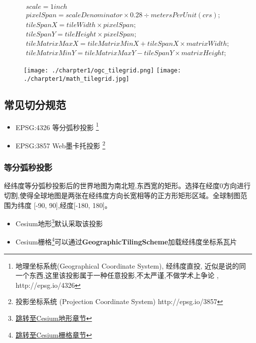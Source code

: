 \begin{align}
	scale = 1 inch                                                    \\
	pixelSpan = scaleDenominator \times 0.28 \div metersPerUnit(crs); \\
	tileSpanX = tileWidth \times pixelSpan;                           \\
	tileSpanY = tileHeight \times pixelSpan;                          \\
	tileMatrixMaxX = tileMatrixMinX + tileSpanX \times matrixWidth;   \\
	tileMatrixMinY = tileMatrixMaxY - tileSpanY \times matrixHeight;
\end{align}

\begin{figure}[!htb]
	\centering
	\texttt{[image: ./charpter1/ogc\_tilegrid.png]}
	\texttt{[image: ./charpter1/math\_tilegrid.jpg]}
\end{figure}

\subsection{常见切分规范}
\begin{itemize}
	\item EPSG:4326 等分弧秒投影 \footnote{地理坐标系统(Geographical Coordinate System), 经纬度直投, 近似是说的同一个东西,这里该投影属于一种任意投影,不太严谨,不做学术上争论 , http://epsg.io/4326}
	\item EPSG:3857 Web墨卡托投影 \footnote{投影坐标系统 (Projection Coordinate System) http://epsg.io/3857}
\end{itemize}

\subsubsection{等分弧秒投影}
\label{sec:lonlat-project}
经纬度等分弧秒投影后的世界地图为南北短,东西宽的矩形。选择在经度0方向进行切割,使得全球地图是两张在经纬度方向长宽相等的正方形矩形区域。全球制图范围为纬度 [-90, 90],经度[-180, 180]。
\begin{itemize}
	\item Cesium地形\footnote{\hyperref[sec:cesium-terrain]{跳转至Cesium地形章节}}默认采取该投影
	\item Cesium栅格\footnote{\hyperref[sec:cesium-raster]{跳转至Cesium栅格章节}}可以通过\textbf{GeographicTilingScheme}加载经纬度坐标系瓦片
\end{itemize}

